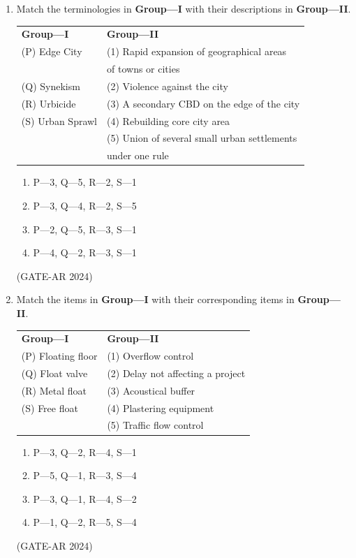 \documentclass[a4paper,10pt]{article}
\begin{document}
\begin{enumerate}
    \item Match the terminologies in \textbf{Group—I} with their descriptions in \textbf{Group—II}. \\
    \begin{tabular}{ l l }
    \textbf{Group—I} & \textbf{Group—II} \\
    (P) Edge City & (1) Rapid expansion of geographical areas \\
    & of towns or cities \\
    (Q) Synekism & (2) Violence against the city \\
    (R) Urbicide & (3) A secondary CBD on the edge of the city \\
    (S) Urban Sprawl & (4) Rebuilding core city area \\
    & (5) Union of several small urban settlements \\
    & under one rule \\
    \end{tabular}
    \begin{multicols}{2}
    \begin{enumerate}
        \item P—3, Q—5, R—2, S—1
        \item P—3, Q—4, R—2, S—5
        \item P—2, Q—5, R—3, S—1
        \item P—4, Q—2, R—3, S—1
    \end{enumerate}
    \end{multicols}
    \hfill (GATE-AR 2024)

    \item Match the items in \textbf{Group—I} with their corresponding items in \textbf{Group—II}. \\
    \begin{tabular}{ l l }
    \textbf{Group—I} & \textbf{Group—II} \\
    (P) Floating floor & (1) Overflow control \\
    (Q) Float valve & (2) Delay not affecting a project \\
    (R) Metal float & (3) Acoustical buffer \\
    (S) Free float & (4) Plastering equipment \\
    & (5) Traffic flow control \\
    \end{tabular}
    \begin{multicols}{4}
    \begin{enumerate}
        \item P—3, Q—2, R—4, S—1
        \item P—5, Q—1, R—3, S—4
        \item P—3, Q—1, R—4, S—2
        \item P—1, Q—2, R—5, S—4
    \end{enumerate}
    \end{multicols}
    \hfill (GATE-AR 2024)


\end{enumerate}
\end{document}
